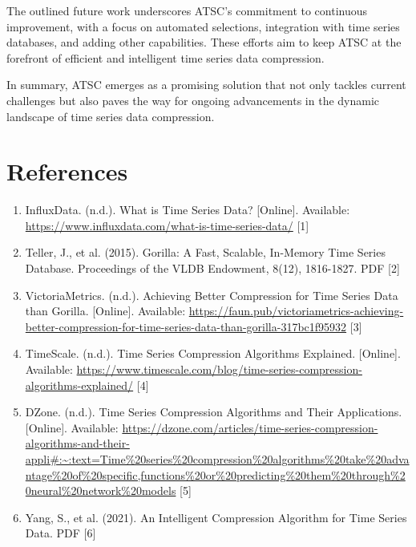 \documentclass[conference]{IEEEtran}
\begin{document}
The outlined future work underscores ATSC's commitment to continuous improvement, with a focus on automated selections, integration with time series databases, and adding other capabilities. These efforts aim to keep ATSC at the forefront of efficient and intelligent time series data compression.

In summary, ATSC emerges as a promising solution that not only tackles current challenges but also paves the way for ongoing advancements in the dynamic landscape of time series data compression.

\section{References}

\begin{enumerate}
    \item InfluxData. (n.d.). What is Time Series Data? [Online]. Available: \url{https://www.influxdata.com/what-is-time-series-data/} [1]

    \item Teller, J., et al. (2015). Gorilla: A Fast, Scalable, In-Memory Time Series Database. Proceedings of the VLDB Endowment, 8(12), 1816-1827. PDF [2]

    \item VictoriaMetrics. (n.d.). Achieving Better Compression for Time Series Data than Gorilla. [Online]. Available: \href{https://faun.pub/victoriametrics-achieving-better-compression-for-time-series-data-than-gorilla-317bc1f95932}{https://faun.pub/victoriametrics-achieving-better-compression-for-time-series-data-than-gorilla-317bc1f95932} [3]

    \item TimeScale. (n.d.). Time Series Compression Algorithms Explained. [Online]. Available: \url{https://www.timescale.com/blog/time-series-compression-algorithms-explained/} [4]

    \item DZone. (n.d.). Time Series Compression Algorithms and Their Applications. [Online]. Available: \url{https://dzone.com/articles/time-series-compression-algorithms-and-their-appli#:~:text=Time%20series%20compression%20algorithms%20take%20advantage%20of%20specific,functions%20or%20predicting%20them%20through%20neural%20network%20models} [5]

    \item Yang, S., et al. (2021). An Intelligent Compression Algorithm for Time Series Data. PDF [6]


\end{enumerate}
\end{document}
